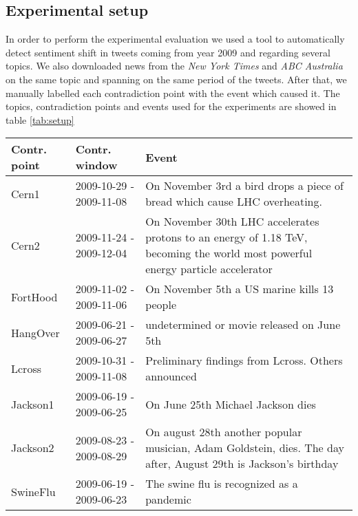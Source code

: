 \subsection*{Experimental setup}
In order to perform the experimental evaluation we used a tool to automatically
detect sentiment shift in tweets coming from year 2009 and regarding several
topics. We also downloaded news from the \emph{New York Times} and \emph{ABC
Australia} on the same topic and spanning on the same period of the tweets.
After that, we manually labelled each contradiction point with the event which
caused it. The topics, contradiction points and events used for the experiments
are showed in table \ref{tab:setup}
\begin{table*}
	\centering
	\begin{tabularx}{\textwidth}{|l|l|X|}
	\hline
	Contr. point 	& Contr. window 			& Event \\
	\hline 
	Cern1			& 2009-10-29 - 2009-11-08 	& On November 3rd a bird drops a
piece of bread which cause LHC overheating. \\
	Cern2			& 2009-11-24 - 2009-12-04	& On November 30th LHC accelerates protons to an
energy of 1.18 TeV, becoming the world most powerful energy particle
accelerator\\
	FortHood 		& 2009-11-02 - 2009-11-06	& On November 5th a US marine
kills 13 people\\
	HangOver		& 2009-06-21 - 2009-06-27	& undetermined or movie released
	on June 5th\\
	Lcross			& 2009-10-31 - 2009-11-08	& Preliminary findings from
	Lcross. Others announced\\
	Jackson1		& 2009-06-19 - 2009-06-25	& On June 25th Michael Jackson
dies\\
	Jackson2		& 2009-08-23 - 2009-08-29	& On august 28th another popular
musician, Adam Goldstein, dies. The day after, August 29th is Jackson's
birthday\\
	SwineFlu		& 2009-06-19 - 2009-06-23	& The swine flu is recognized as
	a pandemic\\
	\hline
	\end{tabularx}
	\caption{Contradiction points used for experimental evaluation}
	\label{tab:setup}
\end{table*}
